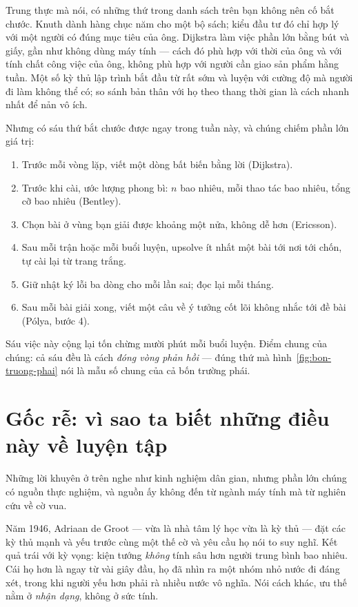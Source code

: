 \documentclass[../../algorithm.tex]{subfiles}
\begin{document}
Trung thực mà nói, có những thứ trong danh sách trên bạn không nên cố bắt chước. Knuth dành hàng chục năm cho một bộ sách; kiểu đầu tư đó chỉ hợp lý với một người có đúng mục tiêu của ông. Dijkstra làm việc phần lớn bằng bút và giấy, gần như không dùng máy tính --- cách đó phù hợp với thời của ông và với tính chất công việc của ông, không phù hợp với người cần giao sản phẩm hằng tuần. Một số kỳ thủ lập trình bắt đầu từ rất sớm và luyện với cường độ mà người đi làm không thể có; so sánh bản thân với họ theo thang thời gian là cách nhanh nhất để nản vô ích.

Nhưng có sáu thứ bắt chước được ngay trong tuần này, và chúng chiếm phần lớn giá trị:

\begin{enumerate}
\item Trước mỗi vòng lặp, viết một dòng bất biến bằng lời (Dijkstra).
\item Trước khi cài, ước lượng phong bì: \(n\) bao nhiêu, mỗi thao tác bao nhiêu, tổng cỡ bao nhiêu (Bentley).
\item Chọn bài ở vùng bạn giải được khoảng một nửa, không dễ hơn (Ericsson).
\item Sau mỗi trận hoặc mỗi buổi luyện, upsolve ít nhất một bài tới nơi tới chốn, tự cài lại từ trang trắng.
\item Giữ nhật ký lỗi ba dòng cho mỗi lần sai; đọc lại mỗi tháng.
\item Sau mỗi bài giải xong, viết một câu về ý tưởng cốt lõi không nhắc tới đề bài (Pólya, bước 4).
\end{enumerate}

Sáu việc này cộng lại tốn chừng mười phút mỗi buổi luyện. Điểm chung của chúng: cả sáu đều là cách \emph{đóng vòng phản hồi} --- đúng thứ mà hình~\ref{fig:bon-truong-phai} nói là mẫu số chung của cả bốn trường phái.

\section{Gốc rễ: vì sao ta biết những điều này về luyện tập}

Những lời khuyên ở trên nghe như kinh nghiệm dân gian, nhưng phần lớn chúng có nguồn thực nghiệm, và nguồn ấy không đến từ ngành máy tính mà từ nghiên cứu về cờ vua.

Năm 1946, Adriaan de Groot --- vừa là nhà tâm lý học vừa là kỳ thủ --- đặt các kỳ thủ mạnh và yếu trước cùng một thế cờ và yêu cầu họ nói to suy nghĩ. Kết quả trái với kỳ vọng: kiện tướng \emph{không} tính sâu hơn người trung bình bao nhiêu. Cái họ hơn là ngay từ vài giây đầu, họ đã nhìn ra một nhóm nhỏ nước đi đáng xét, trong khi người yếu hơn phải rà nhiều nước vô nghĩa. Nói cách khác, ưu thế nằm ở \emph{nhận dạng}, không ở sức tính.
\end{document}
